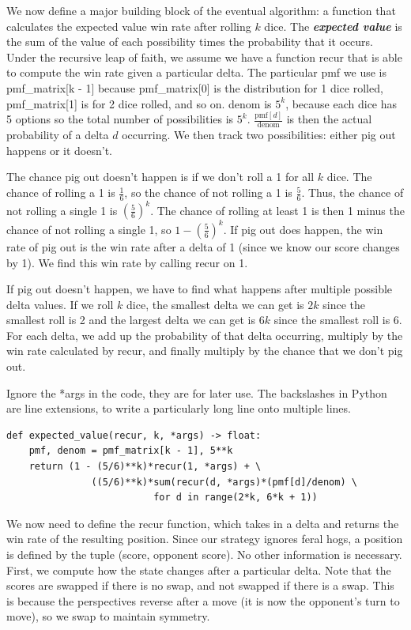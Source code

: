 \documentclass[11pt, oneside]{article}
\newcommand{\emphasis}[1]{\textbf{\textit{#1}}}
\begin{document}
We now define a major building block of the eventual algorithm:
a function that calculates the expected value win rate after rolling \( k \) dice.
The \emphasis{expected value} is the sum of the value of each possibility times
the probability that it occurs.
Under the recursive leap of faith, we assume we have a function recur
that is able to compute the win rate given a particular delta. 
The particular pmf we use is pmf\_matrix[k - 1] because 
pmf\_matrix[0] is the distribution for 1 dice rolled, pmf\_matrix[1]
is for 2 dice rolled, and so on. denom is \( 5^k \),
because each dice has 5 options so the total number of possibilities is
\( 5^k \). \( \frac{\mathrm{pmf}[d]}{\text{denom}} \) is then the actual probability of 
a delta \( d \) occurring.
We then track two possibilities: either pig out happens or it doesn't.

The chance pig out doesn't happen is if we don't roll a 1 for all \( k \) dice.
The chance of rolling a 1 is \( \frac{1}{6} \), so the chance of not 
rolling a 1 is \( \frac{5}{6} \). Thus, the chance of not rolling a single 
1 is \( (\frac{5}{6})^k \). The chance of rolling at least 1 is then
1 minus the chance of not rolling a single 1, so \( 1 - (\frac{5}{6})^k \).
If pig out does happen, the win rate of pig out is the win rate after a delta 
of 1 (since we know our score changes by 1).
We find this win rate by calling recur on 1.

If pig out doesn't happen, we have to find what happens after multiple
possible delta values. If we roll \( k \) dice, 
the smallest delta we can get is \( 2k \) since the smallest roll is 2
and the largest delta we can get is \( 6k \) since the smallest roll is 6.
For each delta, we add up the probability of that delta occurring,
multiply by the win rate calculated by recur, and finally 
multiply by the chance that we don't pig out.

Ignore the *args in the code, they are for later use.
The backslashes in Python are line extensions, to write a particularly long line
onto multiple lines.

\begin{verbatim}
def expected_value(recur, k, *args) -> float:
    pmf, denom = pmf_matrix[k - 1], 5**k
    return (1 - (5/6)**k)*recur(1, *args) + \
               ((5/6)**k)*sum(recur(d, *args)*(pmf[d]/denom) \
                          for d in range(2*k, 6*k + 1))  
\end{verbatim} 

We now need to define the recur function, which takes in a delta
and returns the win rate of the resulting position.
Since our strategy ignores feral hogs, a position is defined 
by the tuple (score, opponent score). No other information is necessary.
First, we compute how the state changes after a particular delta.
Note that the scores are swapped if there is no swap,
and not swapped if there is a swap.
This is because the perspectives reverse after a move
(it is now the opponent's turn to move),
so we swap to maintain symmetry.
\end{document}
